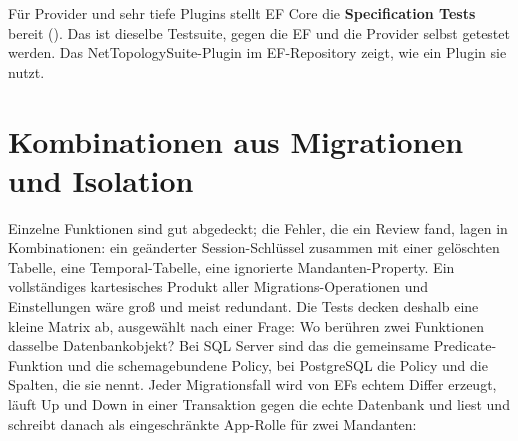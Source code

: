 \begin{tip}
  Für Provider und sehr tiefe Plugins stellt EF Core die \textbf{Specification Tests} bereit
  ().
  Das ist dieselbe Testsuite, gegen die EF und die Provider selbst getestet werden. Das
  NetTopologySuite-Plugin im EF-Repository zeigt, wie ein Plugin sie nutzt.
\end{tip}

\section{Kombinationen aus Migrationen und Isolation}

Einzelne Funktionen sind gut abgedeckt; die Fehler, die ein Review fand, lagen in Kombinationen:
ein geänderter Session-Schlüssel zusammen mit einer gelöschten Tabelle, eine Temporal-Tabelle,
eine ignorierte Mandanten-Property. Ein vollständiges kartesisches Produkt aller
Migrations-Operationen und Einstellungen wäre groß und meist redundant. Die Tests decken deshalb
eine kleine Matrix ab, ausgewählt nach einer Frage: Wo berühren zwei Funktionen dasselbe
Datenbankobjekt? Bei SQL Server sind das die gemeinsame Predicate-Funktion und die
schemagebundene Policy, bei PostgreSQL die Policy und die Spalten, die sie nennt. Jeder
Migrationsfall wird von EFs echtem Differ erzeugt, läuft Up und Down in einer Transaktion gegen
die echte Datenbank und liest und schreibt danach als eingeschränkte App-Rolle für zwei
Mandanten:

